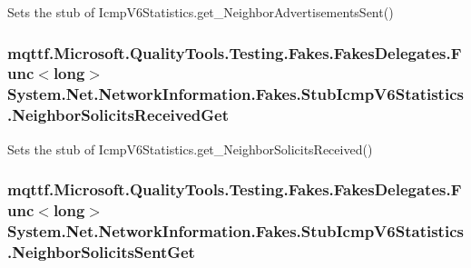 Sets the stub of Icmp\-V6\-Statistics.\-get\-\_\-\-Neighbor\-Advertisements\-Sent()

\hypertarget{class_system_1_1_net_1_1_network_information_1_1_fakes_1_1_stub_icmp_v6_statistics_a32965bb13f239b9646535ff2a0e5ca6b}{
\subsubsection[{Neighbor\-Solicits\-Received\-Get}]{\setlength{\rightskip}{0pt plus 5cm}mqttf.\-Microsoft.\-Quality\-Tools.\-Testing.\-Fakes.\-Fakes\-Delegates.\-Func$<$long$>$ System.\-Net.\-Network\-Information.\-Fakes.\-Stub\-Icmp\-V6\-Statistics.\-Neighbor\-Solicits\-Received\-Get}}\label{class_system_1_1_net_1_1_network_information_1_1_fakes_1_1_stub_icmp_v6_statistics_a32965bb13f239b9646535ff2a0e5ca6b}


Sets the stub of Icmp\-V6\-Statistics.\-get\-\_\-\-Neighbor\-Solicits\-Received()

\hypertarget{class_system_1_1_net_1_1_network_information_1_1_fakes_1_1_stub_icmp_v6_statistics_ad9ddf6343e9d2467c976b0f3546ebbe6}{
\subsubsection[{Neighbor\-Solicits\-Sent\-Get}]{\setlength{\rightskip}{0pt plus 5cm}mqttf.\-Microsoft.\-Quality\-Tools.\-Testing.\-Fakes.\-Fakes\-Delegates.\-Func$<$long$>$ System.\-Net.\-Network\-Information.\-Fakes.\-Stub\-Icmp\-V6\-Statistics.\-Neighbor\-Solicits\-Sent\-Get}}\label{class_system_1_1_net_1_1_network_information_1_1_fakes_1_1_stub_icmp_v6_statistics_ad9ddf6343e9d2467c976b0f3546ebbe6}


